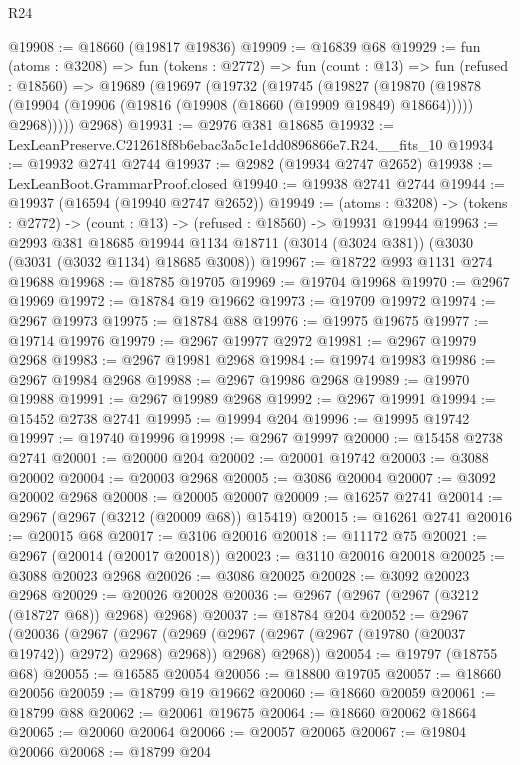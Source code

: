 \begin{lexlean}{R24}
\begin{coremodule}
@19908 := @18660 (@19817 @19836)
@19909 := @16839 @68
@19929 := fun (atoms : @3208) =>
  fun (tokens : @2772) =>
  fun (count : @13) =>
  fun (refused : @18560) =>
  @19689
    (@19697
      (@19732
        (@19745
          (@19827
            (@19870
              (@19878 (@19904 (@19906 (@19816 (@19908 (@18660 (@19909 @19849) @18664))))) @2968)))))
      @2968)
@19931 := @2976 @381 @18685
@19932 := LexLeanPreserve.C212618f8b6ebac3a5c1e1dd0896866e7.R24.__fits_10
@19934 := @19932 @2741 @2744
@19937 := @2982 (@19934 @2747 @2652)
@19938 := LexLeanBoot.GrammarProof.closed
@19940 := @19938 @2741 @2744
@19944 := @19937 (@16594 (@19940 @2747 @2652))
@19949 := (atoms : @3208) ->
  (tokens : @2772) -> (count : @13) -> (refused : @18560) -> @19931 @19944
@19963 := @2993
    @381
    @18685
    @19944
    @1134
    @18711
    (@3014 (@3024 @381))
    (@3030 (@3031 (@3032 @1134) @18685 @3008))
@19967 := @18722 @993 @1131 @274 @19688
@19968 := @18785 @19705
@19969 := @19704 @19968
@19970 := @2967 @19969
@19972 := @18784 @19 @19662
@19973 := @19709 @19972
@19974 := @2967 @19973
@19975 := @18784 @88
@19976 := @19975 @19675
@19977 := @19714 @19976
@19979 := @2967 @19977 @2972
@19981 := @2967 @19979 @2968
@19983 := @2967 @19981 @2968
@19984 := @19974 @19983
@19986 := @2967 @19984 @2968
@19988 := @2967 @19986 @2968
@19989 := @19970 @19988
@19991 := @2967 @19989 @2968
@19992 := @2967 @19991
@19994 := @15452 @2738 @2741
@19995 := @19994 @204
@19996 := @19995 @19742
@19997 := @19740 @19996
@19998 := @2967 @19997
@20000 := @15458 @2738 @2741
@20001 := @20000 @204
@20002 := @20001 @19742
@20003 := @3088 @20002
@20004 := @20003 @2968
@20005 := @3086 @20004
@20007 := @3092 @20002 @2968
@20008 := @20005 @20007
@20009 := @16257 @2741
@20014 := @2967 (@2967 (@3212 (@20009 @68)) @15419)
@20015 := @16261 @2741
@20016 := @20015 @68
@20017 := @3106 @20016
@20018 := @11172 @75
@20021 := @2967 (@20014 (@20017 @20018))
@20023 := @3110 @20016 @20018
@20025 := @3088 @20023 @2968
@20026 := @3086 @20025
@20028 := @3092 @20023 @2968
@20029 := @20026 @20028
@20036 := @2967 (@2967 (@2967 (@3212 (@18727 @68)) @2968) @2968)
@20037 := @18784 @204
@20052 := @2967
    (@20036
      (@2967
        (@2967 (@2969 (@2967 (@2967 (@2967 (@19780 (@20037 @19742)) @2972) @2968) @2968)) @2968)
        @2968))
@20054 := @19797 (@18755 @68)
@20055 := @16585 @20054
@20056 := @18800 @19705
@20057 := @18660 @20056
@20059 := @18799 @19 @19662
@20060 := @18660 @20059
@20061 := @18799 @88
@20062 := @20061 @19675
@20064 := @18660 @20062 @18664
@20065 := @20060 @20064
@20066 := @20057 @20065
@20067 := @19804 @20066
@20068 := @18799 @204

\end{coremodule}
\end{lexlean}
